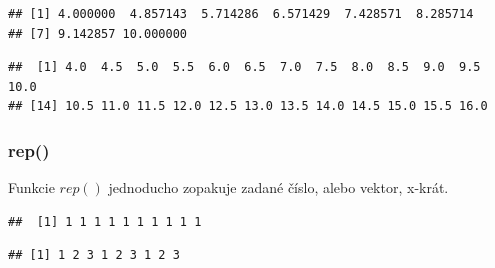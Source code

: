 \begin{verbatim}
## [1] 4.000000  4.857143  5.714286  6.571429  7.428571  8.285714
## [7] 9.142857 10.000000
\end{verbatim}

\begin{Shaded}
\begin{Highlighting}[]

\NormalTok{(} \NormalTok{, } \NormalTok{, } \NormalTok{)}
\end{Highlighting}
\end{Shaded}

\begin{verbatim}
##  [1] 4.0  4.5  5.0  5.5  6.0  6.5  7.0  7.5  8.0  8.5  9.0  9.5 10.0 
## [14] 10.5 11.0 11.5 12.0 12.5 13.0 13.5 14.0 14.5 15.0 15.5 16.0
\end{verbatim}

\hypertarget{rep}{%
\subsubsection{rep()}\label{rep}}

Funkcie \(rep()\) jednoducho zopakuje zadané číslo, alebo vektor,
x-krát.

\begin{Shaded}
\begin{Highlighting}[]
\NormalTok{(} \NormalTok{, } \NormalTok{)}
\end{Highlighting}
\end{Shaded}

\begin{verbatim}
##  [1] 1 1 1 1 1 1 1 1 1 1
\end{verbatim}

\begin{Shaded}
\begin{Highlighting}[]
\NormalTok{(} \NormalTok{(}\NormalTok{, }\NormalTok{, }\NormalTok{), } \NormalTok{)}
\end{Highlighting}
\end{Shaded}

\begin{verbatim}
## [1] 1 2 3 1 2 3 1 2 3
\end{verbatim}


